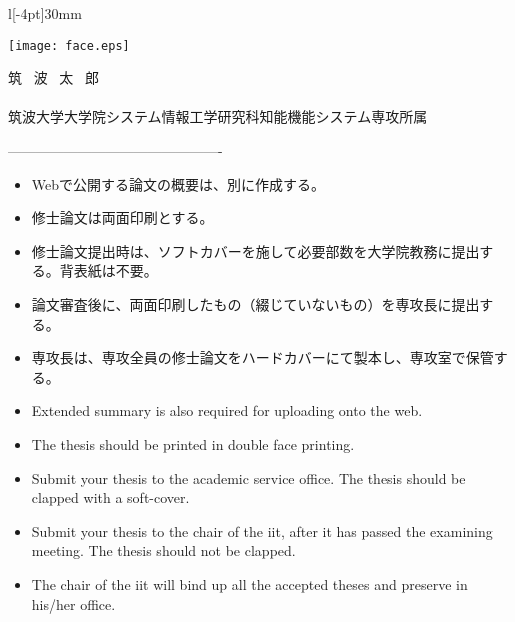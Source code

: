 \documentclass[11pt,twocolumn]{jarticle} %
\begin{document}
\vspace{2zh}
\begin{minipage}{73mm}
 \begin{wrapfigure}[6]{l}[-4pt]{30mm} 
 \begin{center}
  \texttt{[image: face.eps]}
 \end{center}
 \end{wrapfigure}
 \noindent 筑 \ 波 \ 太 \  郎\\\\
 筑波大学大学院システム情報工学研究科知能機能システム専攻所属
\end{minipage}

\vspace{3zh}
----------------------------------------------\par

\begin{itemize}
 \item Webで公開する論文の概要は、別に作成する。
 \item 修士論文は両面印刷とする。
 \item 修士論文提出時は、ソフトカバーを施して必要部数を大学院教務に提出する。背表紙は不要。
 \item 論文審査後に、両面印刷したもの（綴じていないもの）を専攻長に提出する。
 \item 専攻長は、専攻全員の修士論文をハードカバーにて製本し、専攻室で保管する。
\end{itemize}

\begin{itemize}
 \item Extended summary is also required for uploading onto the web.
 \item The thesis should be printed in double face printing.
 \item Submit your thesis to the academic service office. The thesis should be clapped with a soft-cover.
 \item  Submit your thesis to the chair of the iit, after it has passed the examining meeting. The thesis should not be clapped.
 \item The chair of the iit will bind up all the accepted theses and preserve in his/her office.
\end{itemize}
\end{document}

